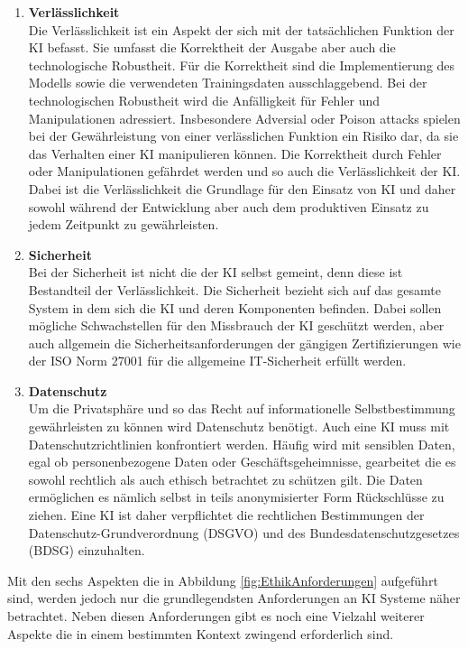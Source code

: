 \begin{onehalfspace}
\begin{enumerate}
            \item \textbf{Verlässlichkeit} \\
            Die Verlässlichkeit ist ein Aspekt der sich mit der tatsächlichen Funktion der \ac*{KI} befasst. Sie umfasst die Korrektheit der Ausgabe aber auch die technologische Robustheit. Für die Korrektheit sind die Implementierung des Modells sowie die verwendeten Trainingsdaten ausschlaggebend. Bei der technologischen Robustheit wird die Anfälligkeit für Fehler und Manipulationen adressiert. Insbesondere Adversial oder Poison attacks spielen bei der Gewährleistung von einer verlässlichen Funktion ein Risiko dar, da sie das Verhalten einer \ac*{KI} manipulieren können. Die Korrektheit durch Fehler oder Manipulationen gefährdet werden und so auch die Verlässlichkeit der \ac{KI}. Dabei ist die Verlässlichkeit die Grundlage für den Einsatz von \ac*{KI} und daher sowohl während der Entwicklung aber auch dem produktiven Einsatz zu jedem Zeitpunkt zu gewährleisten.\cite{Cremers2019}\cite{Hallensleben2020}
            \item \textbf{Sicherheit} \\
            Bei der Sicherheit ist nicht die der \ac*{KI} selbst gemeint, denn diese ist Bestandteil der Verlässlichkeit. Die Sicherheit bezieht sich auf das gesamte System in dem sich die \ac*{KI} und deren Komponenten befinden. Dabei sollen mögliche Schwachstellen für den Missbrauch der \ac*{KI} geschützt werden, aber auch allgemein die Sicherheitsanforderungen der gängigen Zertifizierungen wie der ISO Norm 27001 für die allgemeine IT-Sicherheit erfüllt werden.\cite{Cremers2019}\cite{Hagendorff2020}
            \item \textbf{Datenschutz} \\
            Um die Privatsphäre und so das Recht auf informationelle Selbstbestimmung gewährleisten zu können wird Datenschutz benötigt. Auch eine \ac*{KI} muss mit Datenschutzrichtlinien konfrontiert werden. Häufig wird mit sensiblen Daten, egal ob personenbezogene Daten oder Geschäftsgeheimnisse, gearbeitet die es sowohl rechtlich als auch ethisch betrachtet zu schützen gilt. Die Daten ermöglichen es nämlich selbst in teils anonymisierter Form Rückschlüsse zu ziehen. Eine \ac*{KI} ist daher verpflichtet die rechtlichen Bestimmungen der Datenschutz-Grundverordnung (DSGVO) und des Bundesdatenschutzgesetzes (BDSG) einzuhalten.\cite{Cremers2019}
        \end{enumerate}
        Mit den sechs Aspekten die in Abbildung \ref*{fig:EthikAnforderungen} aufgeführt sind, werden jedoch nur die grundlegendsten Anforderungen an \ac*{KI} Systeme näher betrachtet. Neben diesen Anforderungen gibt es noch eine Vielzahl weiterer Aspekte die in einem bestimmten Kontext zwingend erforderlich sind. 

\end{onehalfspace}
